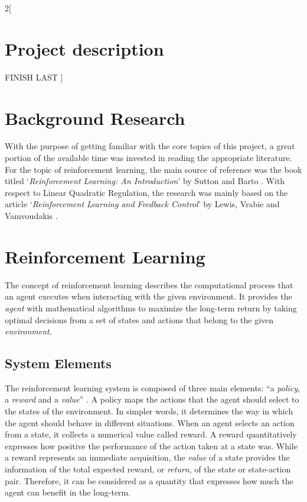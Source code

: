 \documentclass[a4paper]{article}
\begin{document}
	\pagebreak
	
	\begin{multicols}{2}[
		\section*{Project description}
		FINISH LAST
		]
		
		\section{Background Research}
		With the purpose of getting familiar with the core topics of this project, a great portion of the available time was invested in reading the appropriate literature. For the topic of reinforcement learning, the main source of reference was the book titled \enquote*{\textit{Reinforcement Learning: An Introduction}} by Sutton and Barto \cite{reinfbook}. With respect to Linear Quadratic Regulation, the research was mainly based on the article \enquote*{\textit{Reinforcement Learning and Feedback Control}} by Lewis, Vrabie and Vamvoudakis \cite{lqrart}.\par
		
		\section{Reinforcement Learning}
		The concept of reinforcement learning describes the computational process that an agent executes when interacting with the given environment. It provides the \textit{agent} with mathematical algorithms to maximize the long-term return by taking optimal decisions from a set of states and actions that belong to the given \textit{environment}.\par
		
		\subsection{System Elements}
		The reinforcement learning system is composed of three main elements: \enquote{a \textit{policy}, a \textit{reward} and a \textit{value}} \cite{reinfel}. A policy maps the actions that the agent should select to the states of the environment. In simpler words, it determines the way in which the agent should behave in different situations. When an agent selects an action from a state, it collects a numerical value called reward. A reward quantitatively expresses how positive the performance of the action taken at a state was. While a reward represents an immediate acquisition, the \textit{value} of a state provides the information of the total expected reward, or \textit{return}, of the state or state-action pair. Therefore, it can be considered as a quantity that expresses how much the agent can benefit in the long-term.\par
		

\end{multicols}
\end{document}

